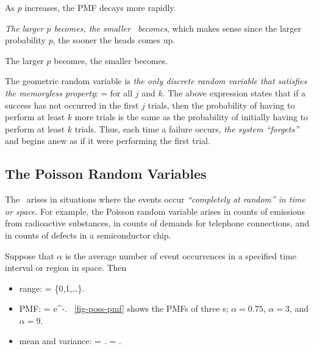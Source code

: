 	\item As $p$ increases, the PMF decays more rapidly.

	\item \emph{The larger $p$ becomes, the smaller \ becomes},
	which makes sense since the larger probability $p$,
	the sooner the heads comes up.

	\item The larger $p$ becomes, the smaller  becomes.

	\item The geometric random variable is \emph{the only discrete random variable
	that satisfies the memoryless property}:
		 = 
	\eeql
	for all $j$ and $k$.
	The above expression states that
	if a success has not occurred in the first $j$ trials,
	then the probability of having to perform at least $k$ more trials
	is the same as the probability of initially having to perform at least $k$ trials.
	Thus, each time a failure occurs,
	\emph{the system ``forgets''} and begins anew
	as if it were performing the first trial.

\eit

\subsection{The Poisson Random Variables}
\bit
	\item The \possrv\ arises in situations where the events occur
	\emph{``completely at random'' in time or space}.
	For example, the Poisson random variable arises
	in counts of emissions from radioactive substances,
	in counts of demands for telephone connections,
	and in counts of defects in a semiconductor chip.

	Suppose that $\alpha$ is the average number of event occurrences
	in a specified time interval or region in space.
	Then
	\begin{itemize}
		\item range:
			\ssx = \{0,1,\ldots \}.
		\eeql
		\item PMF:
			 = e^{-\al}.
		\eeql
		\figurename~\ref{fig-poss-pmf} shows the PMFs of three \possrv s;
		$\alpha=0.75$, $\alpha=3$, and $\alpha=9$.

		\item mean and variance:
			 = \al.
		\eeql
			 = \al.
		\eeql
	\end{itemize}

